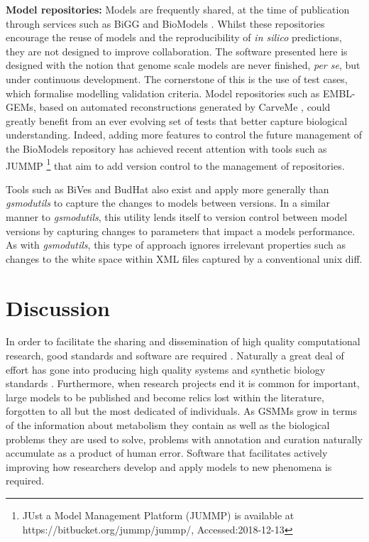 \documentclass[journal=asbcd6]{achemso}
\begin{document}
\textbf{Model repositories:} Models are frequently shared, at the time of publication through services such as BiGG \cite{king2015bigg} and BioModels \cite{chelliah2013biomodels}. 
Whilst these repositories encourage the reuse of models and the reproducibility of \textit{in silico} predictions, they are not designed to improve collaboration.
The software presented here is designed with the notion that genome scale models are never finished, \textit{per se}, but under continuous development.
The cornerstone of this is the use of test cases, which formalise modelling validation criteria.
Model repositories such as EMBL-GEMs, based on automated reconstructions generated by CarveMe \cite{machado2018fast}, could greatly benefit from an ever evolving set of tests that better capture biological understanding.
Indeed, adding more features to control the future management of the BioModels repository has achieved recent attention with tools such as JUMMP \footnote{JUst a Model Management Platform (JUMMP) is available at {https://bitbucket.org/jummp/jummp/}, Accessed:2018-12-13} that aim to add version control to the management of repositories.

Tools such as BiVes and BudHat \cite{scharm2018algorithm} also exist and apply more generally than \textit{gsmodutils} to capture the changes to models between versions.
In a similar manner to \textit{gsmodutils}, this utility lends itself to version control between model versions by capturing changes to parameters that impact a models performance.
As with \textit{gsmodutils}, this type of approach ignores irrelevant properties such as changes to the white space within XML files captured by a conventional unix diff.


\section{Discussion}
In order to facilitate the sharing and dissemination of high quality computational research, good standards and software are required \cite{jimenez2017four}.
Naturally a great deal of effort has gone into producing high quality systems and synthetic biology standards \cite{hucka2003systems, cox2018synthetic}.
Furthermore, when research projects end it is common for important, large models to be published and become relics lost within the literature, forgotten to all but the most dedicated of individuals.
As GSMMs grow in terms of the information about metabolism they contain as well as the biological problems they are used to solve, problems with annotation and curation naturally accumulate as a product of human error.
Software that facilitates actively improving how researchers develop and apply models to new phenomena is required.
\end{document}
